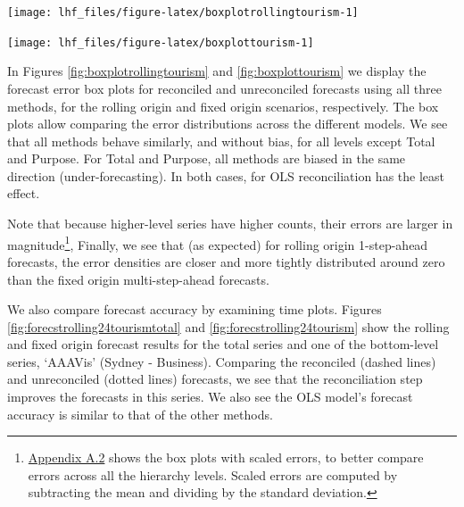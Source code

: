 \documentclass[11pt,a4paper,]{article}
\let\origfigure\figure
\let\endorigfigure\endfigure
\renewenvironment{figure}[1][2] {
    \expandafter\origfigure\expandafter[!htbp]
} {
    \endorigfigure
}
\begin{document}
\begin{figure}

{\centering \texttt{[image: lhf\_files/figure-latex/boxplotrollingtourism-1]} 

}

\caption{Box plots of rolling origin forecast errors from reconciled and unreconciled ETS, ARIMA and OLS methods at each hierarchical level.}\label{fig:boxplotrollingtourism}
\end{figure}

\begin{figure}

{\centering \texttt{[image: lhf\_files/figure-latex/boxplottourism-1]} 

}

\caption{Box plots of fixed origin forecast errors for reconciled and unreconciled ETS, ARIMA and OLS methods at each hierarchical level.}\label{fig:boxplottourism}
\end{figure}

In Figures \ref{fig:boxplotrollingtourism} and \ref{fig:boxplottourism} we display the forecast error box plots for reconciled and unreconciled forecasts using all three methods, for the rolling origin and fixed origin scenarios, respectively. The box plots allow comparing the error distributions across the different models. We see that all methods behave similarly, and without bias, for all levels except Total and Purpose. For Total and Purpose, all methods are biased in the same direction (under-forecasting). In both cases, for OLS reconciliation has the least effect.

Note that because higher-level series have higher counts, their errors are larger in magnitude\footnote{\protect\hyperlink{appendixA.2}{Appendix A.2} shows the box plots with scaled errors, to better compare errors across all the hierarchy levels. Scaled errors are computed by subtracting the mean and dividing by the standard deviation.}, Finally, we see that (as expected) for rolling origin 1-step-ahead forecasts, the error densities are closer and more tightly distributed around zero than the fixed origin multi-step-ahead forecasts.

We also compare forecast accuracy by examining time plots. Figures \ref{fig:forecstrolling24tourismtotal} and \ref{fig:forecstrolling24tourism} show the rolling and fixed origin forecast results for the total series and one of the bottom-level series, `AAAVis' (Sydney - Business). Comparing the reconciled (dashed lines) and unreconciled (dotted lines) forecasts, we see that the reconciliation step improves the forecasts in this series. We also see the OLS model's forecast accuracy is similar to that of the other methods.
\end{document}
